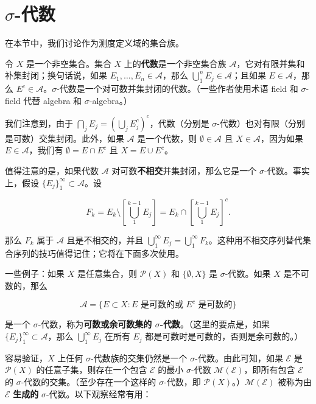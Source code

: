 \documentclass[lang=cn,10pt,thmcnt=section]{elegantbook}
\begin{document}
\section{$\sigma$-代数}

在本节中，我们讨论作为测度定义域的集合族。

令 $X$ 是一个非空集合。集合 $X$ 上的\textbf{代数}是一个非空集合族 $\mathcal{A}$，它对有限并集和补集封闭；换句话说，如果 $E_1, \ldots, E_n \in \mathcal{A}$，那么 $\bigcup_{1}^{n} E_j \in \mathcal{A}$；且如果 $E \in \mathcal{A}$，那么 $E^c \in \mathcal{A}$。$\sigma$-代数是一个对可数并集封闭的代数。（一些作者使用术语 field 和 $\sigma$-field 代替 algebra 和 $\sigma$-algebra。）

我们注意到，由于 $\bigcap_{j} E_j = \left(\bigcup_{j} E_j^c\right)^c$，代数（分别是 $\sigma$-代数）也对有限（分别是可数）交集封闭。此外，如果 $\mathcal{A}$ 是一个代数，则 $\emptyset \in \mathcal{A}$ 且 $X \in \mathcal{A}$，因为如果 $E \in \mathcal{A}$，我们有 $\emptyset = E \cap E^c$ 且 $X = E \cup E^c$。

值得注意的是，如果代数 $\mathcal{A}$ 对可数\textbf{不相交}并集封闭，那么它是一个 $\sigma$-代数。事实上，假设 $\{E_j\}_1^\infty \subset \mathcal{A}$。设

\[F_k = E_k \setminus \left[\bigcup_{1}^{k-1} E_j\right] = E_k \cap \left[\bigcup_{1}^{k-1} E_j\right]^c.\]

那么 $F_k$ 属于 $\mathcal{A}$ 且是不相交的，并且 $\bigcup_{1}^{\infty} E_j = \bigcup_{1}^{\infty} F_k$。这种用不相交序列替代集合序列的技巧值得记住；它将在下面多次使用。

一些例子：如果 $X$ 是任意集合，则 $\mathcal{P}(X)$ 和 $\{\emptyset, X\}$ 是 $\sigma$-代数。如果 $X$ 是不可数的，那么

\[\mathcal{A} = \{E \subset X : E \text{ 是可数的或 } E^c \text{ 是可数的}\}\]

是一个 $\sigma$-代数，称为\textbf{可数或余可数集的 $\sigma$-代数}。（这里的要点是，如果 $\{E_j\}_1^\infty \subset \mathcal{A}$，那么 $\bigcup_{1}^{\infty} E_j$ 在所有 $E_j$ 都是可数时是可数的，否则是余可数的。）

容易验证，$X$ 上任何 $\sigma$-代数族的交集仍然是一个 $\sigma$-代数。由此可知，如果 $\mathcal{E}$ 是 $\mathcal{P}(X)$ 的任意子集，则存在一个包含 $\mathcal{E}$ 的最小 $\sigma$-代数 $\mathcal{M}(\mathcal{E})$，即所有包含 $\mathcal{E}$ 的 $\sigma$-代数的交集。（至少存在一个这样的 $\sigma$-代数，即 $\mathcal{P}(X)$。）$\mathcal{M}(\mathcal{E})$ 被称为由 $\mathcal{E}$ \textbf{生成的} $\sigma$-代数。以下观察经常有用：
\end{document}
